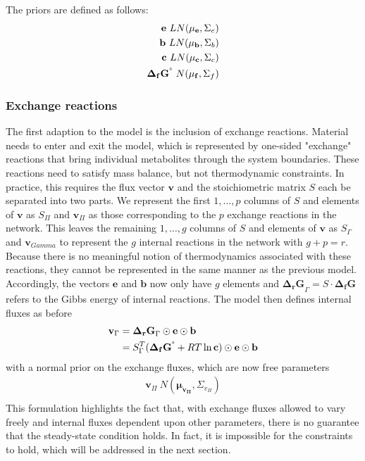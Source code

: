 \documentclass[10pt,letterpaper]{article}
\newcommand{\dgf}{\Delta_fG}
\newcommand{\sdgf}{\Delta_fG^{\degree}}
\newcommand{\dgr}{\Delta_rG}
\newcommand{\bdgf}{\mathbf{\dgf}}
\newcommand{\bsdgf}{\mathbf{\sdgf}}
\newcommand{\bdgr}{\mathbf{\dgr}}
\newcommand{\be}{\mathbf{e}}
\newcommand{\bc}{\mathbf{c}}
\newcommand{\bb}{\mathbf{b}}
\newcommand{\bv}{\mathbf{v}}
\begin{document}
The priors are defined as follows:
\begin{align*}
    \be ~ LN(\mathbf{\mu_e}, \Sigma_e) \\
    \bb ~ LN(\mathbf{\mu_b}, \Sigma_b) \\
    \bc ~ LN(\mathbf{\mu_c}, \Sigma_c) \\
    \bsdgf ~ N(\mathbf{\mu_{f}}, \Sigma_{f}) \\
\end{align*}

\subsubsection{Exchange reactions}
The first adaption to the model is the inclusion of exchange reactions.
Material needs to enter and exit the model, which is represented by one-sided "exchange" reactions that bring individual metabolites through the system boundaries.
These reactions need to satisfy mass balance, but not thermodynamic constraints.
In practice, this requires the flux vector $\bv$ and the stoichiometric matrix $S$ each be separated into two parts.
We represent the first $1,\dots,p$ columns of $S$ and elements of $\bv$ as $S_\Pi$ and $\bv_\Pi$ as those corresponding to the $p$ exchange reactions in the network.
This leaves the remaining $1,\dots,g$ columns of $S$ and elements of $\bv$ as $S_\Gamma$ and $\bv_{Gamma}$ to represent the $g$ internal reactions in the network with $g+p=r$.
Because there is no meaningful notion of thermodynamics associated with these reactions, they cannot be represented in the same manner as the previous model.
Accordingly, the vectors $\be$ and $\bb$ now only have $g$ elements and $\bdgr_{\Gamma} = S\cdot \bdgf$ refers to the Gibbs energy of internal reactions.
The model then defines internal fluxes as before
\begin{align}
    \bv_\Gamma &= \bdgr_{\Gamma} \odot \be \odot \bb \\
        &= S_{\Gamma}^T (\bsdgf + RT\ln{\bc}) \odot \be \odot \bb \\
\end{align}
with a normal prior on the exchange fluxes, which are now free parameters
\begin{align*}
    \bv_{\Pi} ~ N(\mathbf{\mu_{v_{\Pi}}}, \Sigma_{v_{\Pi}}) \\
\end{align*}
This formulation highlights the fact that, with exchange fluxes allowed to vary freely and internal fluxes dependent upon other parameters, there is no guarantee that the steady-state condition holds.
In fact, it is impossible for the constraints to hold, which will be addressed in the next section.
\end{document}
